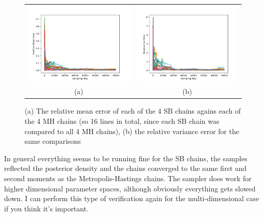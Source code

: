 \documentclass[12pt,a4paper]{article}
\begin{document}
\begin{figure}
  \begin{tabular}{cc}
    \includegraphics[scale=.5]{./Figs/rel_mean_err.png}  & \includegraphics[scale=.5]{./Figs/rel_var_err.png}\\
    (a) & (b)\\
  \end{tabular}
  \caption{(a) The relative mean error of each of the 4 SB chains agains each of the 4 MH chains (so 16 lines in total, since each SB chain was compared to all 4 MH chains), (b) the relative variance error for the same comparisons}
\end{figure}

In general everything seems to be running fine for the SB chains, the samples reflected the posterior density and the chains converged to the same first and second moments as the Metropolis-Hastings chains.  The sampler does work for higher dimensional parameter spaces, although obviously everything gets slowed down.  I can perform this type of verification again for the multi-dimensional case if you think it's important.
\end{document}
